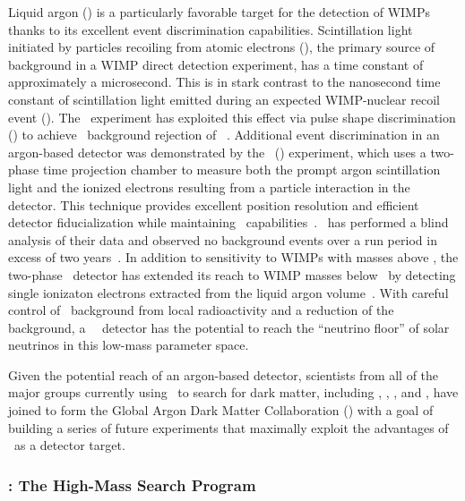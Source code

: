 Liquid argon (\LAr) is a particularly favorable target for the detection of WIMPs thanks to its excellent event discrimination capabilities. Scintillation light initiated by particles recoiling from atomic electrons (\ERs), the primary source of background in a WIMP direct detection experiment, has a time constant of approximately a microsecond. This is in stark contrast to the nanosecond time constant of scintillation light emitted during an expected WIMP-nuclear recoil event (\NR). The \DEAP\ experiment has exploited this effect via pulse shape discrimination (\PSD) to achieve \ER\ background rejection of \DEAPPSDRejection~\cite{Amaudruz:2018gr,Ajaj:2019wi}. Additional event discrimination in an argon-based detector was demonstrated by the \DSf\ (\DSfs) experiment, which uses a two-phase time projection chamber to measure both the prompt argon scintillation light and the ionized electrons resulting from a particle interaction in the detector. This technique provides excellent position resolution and efficient detector fiducialization while maintaining \PSD\ capabilities~\cite{Agnes:2015gu,Agnes:2016fz}.  \DSfs\ has performed a blind analysis of their data and observed no background events over a run period in excess of two years~\cite{Agnes:2018ep}. In addition to sensitivity to WIMPs with masses above \DSkHighMassThreshold, the two-phase \DSfs\ detector has extended its reach to WIMP masses below \DSlLowMassThreshold\ by detecting single ionizaton electrons extracted from the liquid argon volume~\cite{Agnes:2018fg,Agnes:2018ft}.  With careful control of \ER\ background from local radioactivity and a reduction of the  background, a \DSlApproxMassScale\ \LAr\ detector has the potential to reach the ``neutrino floor'' of solar neutrinos in this low-mass parameter space.


Given the potential reach of an argon-based detector, scientists from all of the major groups currently using \LAr\ to search for dark matter, including \ArDM, \DSfs, \DEAP, and \mCLEAN, have joined to form the Global Argon Dark Matter Collaboration (\GADMC) with a goal of building a series of future experiments that maximally exploit the advantages of \LAr\ as a detector target. 


\subsubsection{\DSk: The High-Mass Search Program}
\label{sec:DSk}

